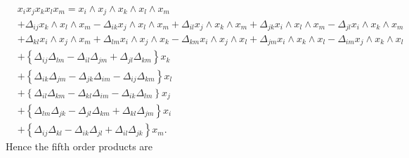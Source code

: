 \documentclass[aps, preprint]{revtex4}
\begin{document}
\begin{align} & x_{i} x_{j} x_{k} x_{l} x_{m} =x_{i} \wedge x_{j} \wedge x_{k} \wedge x_{l} \wedge x_{m} \nonumber  \\
 &  + \Delta _{i j}x_{k} \wedge x_{l} \wedge x_{m} - \Delta _{i k}x_{j} \wedge x_{l} \wedge x_{m} + \Delta _{i l}x_{j} \wedge x_{k} \wedge x_{m} + \Delta _{j k}x_{i} \wedge x_{l} \wedge x_{m} - \Delta _{j l}x_{i} \wedge x_{k} \wedge x_{m} \nonumber  \\
 &  + \Delta _{k l}x_{i} \wedge x_{j} \wedge x_{m} + \Delta _{l m}x_{i} \wedge x_{j} \wedge x_{k} - \Delta _{k m}x_{i} \wedge x_{j} \wedge x_{l} + \Delta _{j m}x_{i} \wedge x_{k} \wedge x_{l} - \Delta _{i m}x_{j} \wedge x_{k} \wedge x_{l} \nonumber  \\
 &  +\left \{ \Delta _{i j} \Delta _{l m} -  \Delta _{i l} \Delta _{j m} +  \Delta _{j l} \Delta _{k m}\right \} x_{k} \nonumber  \\
 &  +\left \{ \Delta _{i k} \Delta _{j m} -  \Delta _{j k} \Delta _{i m} -  \Delta _{i j} \Delta _{k m}\right \} x_{l} \nonumber  \\
 &  +\left \{ \Delta _{i l} \Delta _{k m} -  \Delta _{k l} \Delta _{i m} -  \Delta _{i k} \Delta _{l m}\right \} x_{j} \nonumber  \\
 &  +\left \{ \Delta _{l m} \Delta _{j k} -  \Delta _{j l} \Delta _{k m} +  \Delta _{k l} \Delta _{j m}\right \} x_{i} \nonumber  \\
 &  +\left \{ \Delta _{i j} \Delta _{k l} -  \Delta _{i k} \Delta _{j l} +  \Delta _{i l} \Delta _{j k}\right \} x_{m}\text{.}\end{align}Hence the fifth order products are
\end{document}
